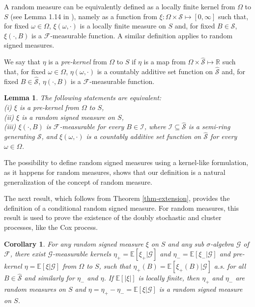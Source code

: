 \documentclass{article}
\theoremstyle{plain}
\newtheorem{lemma}[theorem]{Lemma}
\newtheorem{corollary}[theorem]{Corollary}
\theoremstyle{remark}
\begin{document}
A random measure can be equivalently defined as a locally finite kernel from $\Omega$ to $S$ (see Lemma 1.14 in \citet{Kallenberg2}), namely as a function from $\xi:\Omega\times \mathcal{S}\mapsto[0,\infty]$ such that, for fixed $\omega\in\Omega$, $\xi(\omega,\cdot)$ is a locally finite measure on $S$ and, for fixed $B\in\mathcal{S}$, $\xi(\cdot, B)$ is a $\mathcal{F}$-measurable function. A similar definition applies to random signed measures.

We say that $\eta$ is a \textit{pre-kernel} from $\Omega$ to $S$ if $\eta$ is a map from $\Omega\times \hat{\mathcal{S}}\mapsto \mathbb{R}$ such that, for fixed $\omega\in\Omega$, $\eta(\omega,\cdot)$ is a countably additive set function on $\hat{\mathcal{S}}$ and, for fixed $B\in\hat{\mathcal{S}}$, $\eta(\cdot, B)$ is a $\mathcal{F}$-measurable function.

\begin{lemma}\label{lem-kernel}
	The following statements are equivalent:
	\\ \textnormal{(i)} $\xi$ is a pre-kernel from $\Omega$ to $S$,
	\\  \textnormal{(ii)} $\xi$ is a random signed measure on $S$,
	\\  \textnormal{(iii)} $\xi(\cdot,B)$ is $\mathcal{F}$-measurable for every $B\in\mathcal{I}$, where $\mathcal{I}\subseteq\hat{\mathcal{S}}$ is a semi-ring generating $\mathcal{S}$, and $\xi(\omega,\cdot)$ is a countably additive set function on $\hat{\mathcal{S}}$ for every $\omega\in\Omega$.
\end{lemma}

The possibility to define random signed measures using a kernel-like formulation, as it happens for random measures, shows that our definition is a natural generalization of the concept of random measure.

The next result, which follows from Theorem \ref{thm-extension}, provides the definition of a conditional random signed measure. For random measures, this result is used to prove the existence of the doubly stochastic and cluster processes, like the Cox process.
\begin{corollary}\label{co-uncited-4}
	For any random signed measure $\xi$ on $S$ and any sub $\sigma$-algebra $\mathcal{G}$ of $\mathcal{F}$, there exist $\mathcal{G}$-measurable kernels $\eta_+ = \mathbb{E}[\xi_+|\mathcal{G}]$ and $\eta_- = \mathbb{E}[\xi_-|\mathcal{G}]$ and pre-kernel $\eta = \mathbb{E}[\xi|\mathcal{G}]$ from $\Omega$ to $S$, such that $\eta_+(B) = \mathbb{E}[\xi_+(B)|\mathcal{G}]$ a.s. for all $B\in\hat{\mathcal{S}}$ and similarly for $\eta_-$ and $\eta$. If $\mathbb{E}[|\xi|]$ is locally finite, then $\eta_+$ and $\eta_-$ are random measures on $S$ and $\eta=\eta_+-\eta_-= \mathbb{E}[\xi|\mathcal{G}]$ is a random signed measure on $S$.
\end{corollary}
\end{document}
